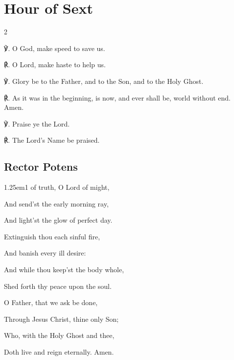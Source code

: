 \fancyhead[RE,LO]{}
\section{Hour of Sext}


\begin{multicols}{2}

℣. O God, {} make speed to save us.

℟. O Lord, make haste to help us.

℣. Glory be to the Father, and to the Son, and to the Holy Ghost.

℟. As it was in the beginning, is now, and ever shall be, world without end. Amen.

℣. Praise ye the Lord.

℟. The Lord's Name be praised.

\subsection{Rector Potens}

\begin{hangparas}{1.25em}{1}
 of truth, O Lord of might,\par
{}
\par\noindent
And send'st the early morning ray,\par\noindent
And light'st the glow of perfect day.\\
\par\noindent
Extinguish thou each sinful fire,\par\noindent
And banish every ill desire:\par\noindent
And while thou keep'st the body whole,\par\noindent
Shed forth thy peace upon the soul.\\
\par\noindent
O Father, that we ask be done,\par\noindent
Through Jesus Christ, thine only Son;\par\noindent
Who, with the Holy Ghost and thee,\par\noindent
Doth live and reign eternally. Amen.\\
\end{hangparas}


\end{multicols}
